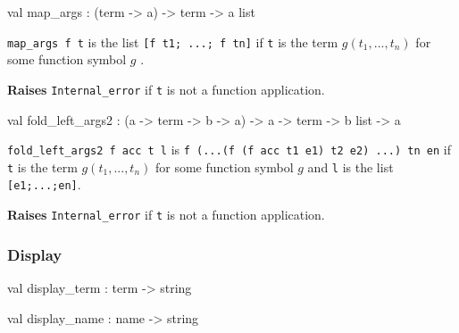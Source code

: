 \label{val:Term.map-underscoreargs}\begin{ocamldoccode}
val map_args : (term -> {\textquotesingle}a) -> term -> {\textquotesingle}a list
\end{ocamldoccode}
\begin{ocamldocdescription}
{\tt{map\_args f t}} is the list {\tt{[f t1; ...; f tn]}} if {\tt{t}} is
    the term $g(t_1,...,t_n)$  for some function symbol $g$ .

{\bf Raises} {\tt{Internal\_error}} if {\tt{t}} is not a function application.


\end{ocamldocdescription}




\label{val:Term.fold-underscoreleft-underscoreargs2}\begin{ocamldoccode}
val fold_left_args2 : ({\textquotesingle}a -> term -> {\textquotesingle}b -> {\textquotesingle}a) -> {\textquotesingle}a -> term -> {\textquotesingle}b list -> {\textquotesingle}a
\end{ocamldoccode}
\begin{ocamldocdescription}
{\tt{fold\_left\_args2 f acc t l}} is {\tt{f (...(f (f acc t1 e1) t2 e2) ...) tn en}} if {\tt{t}} is
    the term $g(t_1,...,t_n)$  for some function symbol $g$ 
    and {\tt{l}} is the list {\tt{[e1;...;en]}}.

{\bf Raises} {\tt{Internal\_error}} if {\tt{t}} is not a function application.


\end{ocamldocdescription}




\subsubsection{Display}




\label{val:Term.display-underscoreterm}\begin{ocamldoccode}
val display_term : term -> string
\end{ocamldoccode}




\label{val:Term.display-underscorename}\begin{ocamldoccode}
val display_name : name -> string
\end{ocamldoccode}




